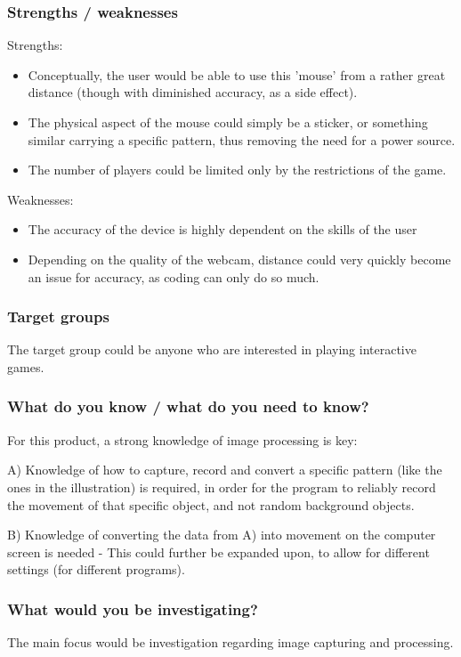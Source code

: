 \subsubsection*{Strengths / weaknesses}
Strengths:
\begin{itemize}
\item Conceptually, the user would be able to use this 'mouse' from a rather great distance (though with diminished accuracy, as a side effect).
\item The physical aspect of the mouse could simply be a sticker, or something similar carrying a 	specific pattern, thus removing the need for a power source.
\item The number of players could be limited only by the restrictions of the game.
\end{itemize}
Weaknesses:
\begin{itemize}
\item The accuracy of the device is highly dependent on the skills of the user
\item Depending on the quality of the webcam, distance could very quickly become an issue for 	accuracy, as coding can only do so much.
\end{itemize}

\subsubsection*{Target groups}
The target group could be anyone who are interested in playing interactive games. 

\subsubsection*{What do you know / what do you need to know?}
For this product, a strong knowledge of image processing is key:
\bigskip

A) Knowledge of how to capture, record and convert a specific pattern (like the ones in the illustration) is required, in order for the program to reliably record the movement of that specific object, and not random background objects.
\bigskip

B) Knowledge of converting the data from A) into movement on the computer screen is needed - This could further be expanded upon, to allow for different settings (for different programs).

\subsubsection*{What would you be investigating?}
The main focus would be investigation regarding image capturing and processing.
\bigskip

